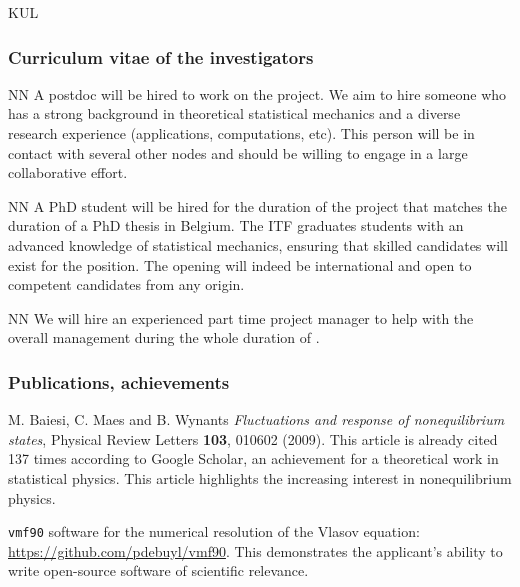 \begin{sitedescription}{KUL}
\subsubsection*{Curriculum vitae of the investigators}




\begin{participant}[type=res,PM=48,salary=5500]{NN}
A postdoc will be hired to work on the project. We aim to hire someone who has a strong
background in theoretical statistical mechanics and a diverse research experience
(applications, computations, etc).
%
This person will be in contact with several other nodes and should be willing to engage in a
large collaborative effort.
\end{participant}

\begin{participant}[type=res,PM=48,salary=3500]{NN}
A PhD student will be hired for the duration of the project that matches the duration of a
PhD thesis in Belgium. The ITF graduates students with an advanced knowledge of statistical
mechanics, ensuring that skilled candidates will exist for the position.
%
The opening will indeed be international and open to competent candidates from any
origin.
\end{participant}

\begin{participant}[type=res,PM=24,salary=3932]{NN}
We will hire an experienced part time project manager to help with the overall management
during the whole duration of \TheProject.
\end{participant}

\subsubsection*{Publications, achievements}

\begin{compactenum}
\item M. Baiesi, C. Maes and B. Wynants {\em Fluctuations and response of nonequilibrium
  states}, Physical Review Letters {\bf 103}, 010602 (2009). This article is already cited
137 times according to Google Scholar, an achievement for a theoretical work in statistical
physics. This article highlights the increasing interest in nonequilibrium physics.
\item {\tt vmf90} software for the numerical resolution of the Vlasov equation:
\url{https://github.com/pdebuyl/vmf90}. This demonstrates the applicant's ability to write
open-source software of scientific relevance.
\end{compactenum}



\end{sitedescription}
